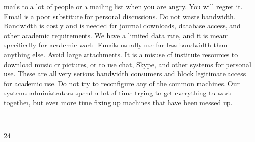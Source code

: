 \documentclass[a4paper,10pt]{article}
\begin{document}
mails to a lot of people or a mailing list when you are angry. You will regret it. Email is a
poor substitute for personal discussions.
Do not waste bandwidth. Bandwidth is costly and is needed for journal downloads, database
access, and other academic requirements. We have a limited data rate, and it is meant
specifically for academic work. Emails usually use far less bandwidth than anything else.
Avoid large attachments. It is a misuse of institute resources to download music or pictures,
or to use chat, Skype, and other systems for personal use. These are all very serious
bandwidth consumers and block legitimate access for academic use.
Do not try to reconfigure any of the common machines. Our systems administrators spend a
lot of time trying to get everything to work together, but even more time fixing up machines
that have been messed up.

	
  

24	
  
\end{document}
